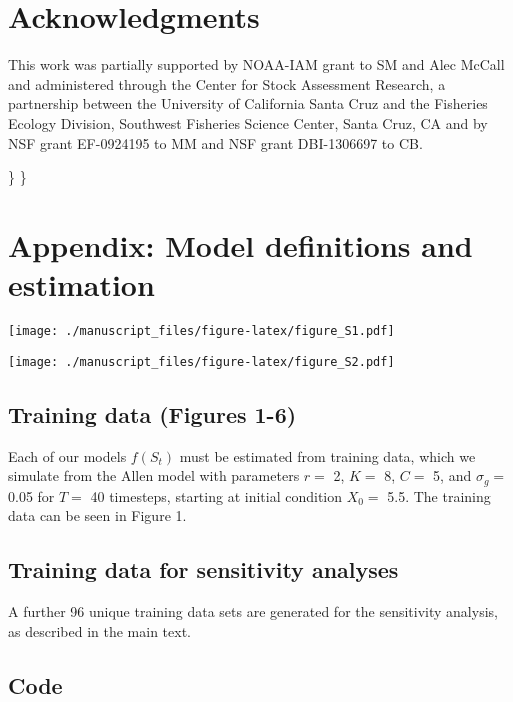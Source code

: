 \documentclass[]{components/elsarticle}
\begin{document}
\section{Acknowledgments}\label{acknowledgments}

This work was partially supported by NOAA-IAM grant to SM and Alec
McCall and administered through the Center for Stock Assessment
Research, a partnership between the University of California Santa Cruz
and the Fisheries Ecology Division, Southwest Fisheries Science Center,
Santa Cruz, CA and by NSF grant EF-0924195 to MM and NSF grant
DBI-1306697 to CB.

\appendix
\renewcommand*{\thefigure}{S\arabic{figure}}
\renewcommand*{\thetable}{S\arabic{table}} \setcounter{figure}{0}\}
\setcounter{table}{0}\}

\section{Appendix: Model definitions and
estimation}\label{appendix-model-definitions-and-estimation}

\texttt{[image: ./manuscript\_files/figure-latex/figure\_S1.pdf]}

\texttt{[image: ./manuscript\_files/figure-latex/figure\_S2.pdf]}

\newpage

\subsection{Training data (Figures
1-6)}\label{training-data-figures-1-6}

Each of our models $f(S_t)$ must be estimated from training data, which
we simulate from the Allen model with parameters $r = $ 2, $K =$ 8,
$C =$ 5, and $\sigma_g =$ 0.05 for $T=$ 40 timesteps, starting at
initial condition $X_0 = $ 5.5. The training data can be seen in Figure
1.

\subsection{Training data for sensitivity
analyses}\label{training-data-for-sensitivity-analyses}

A further 96 unique training data sets are generated for the sensitivity
analysis, as described in the main text.

\subsection{Code}\label{code}
\end{document}
